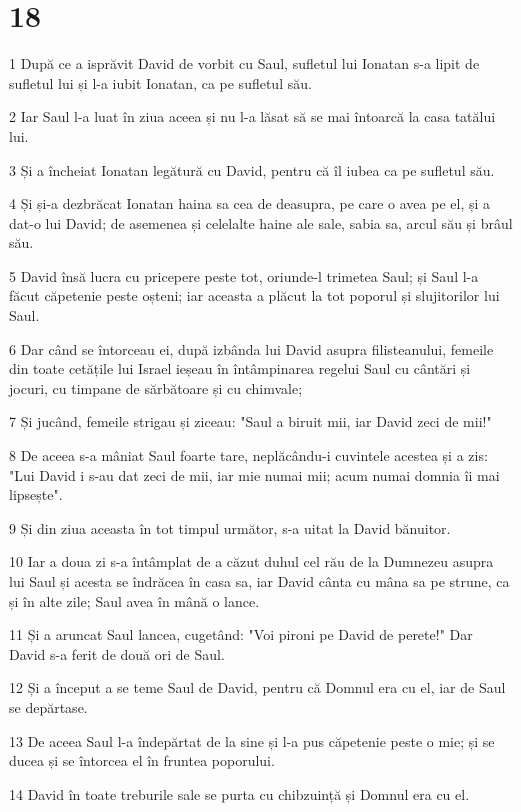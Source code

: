 \chapter{18}

\par 1 După ce a isprăvit David de vorbit cu Saul, sufletul lui Ionatan s-a lipit de sufletul lui și l-a iubit Ionatan, ca pe sufletul său.
\par 2 Iar Saul l-a luat în ziua aceea și nu l-a lăsat să se mai întoarcă la casa tatălui lui.
\par 3 Și a încheiat Ionatan legătură cu David, pentru că îl iubea ca pe sufletul său.
\par 4 Și și-a dezbrăcat Ionatan haina sa cea de deasupra, pe care o avea pe el, și a dat-o lui David; de asemenea și celelalte haine ale sale, sabia sa, arcul său și brâul său.
\par 5 David însă lucra cu pricepere peste tot, oriunde-l trimetea Saul; și Saul l-a făcut căpetenie peste oșteni; iar aceasta a plăcut la tot poporul și slujitorilor lui Saul.
\par 6 Dar când se întorceau ei, după izbânda lui David asupra filisteanului, femeile din toate cetățile lui Israel ieșeau în întâmpinarea regelui Saul cu cântări și jocuri, cu timpane de sărbătoare și cu chimvale;
\par 7 Și jucând, femeile strigau și ziceau: "Saul a biruit mii, iar David zeci de mii!"
\par 8 De aceea s-a mâniat Saul foarte tare, neplăcându-i cuvintele acestea și a zis: "Lui David i s-au dat zeci de mii, iar mie numai mii; acum numai domnia îi mai lipsește".
\par 9 Și din ziua aceasta în tot timpul următor, s-a uitat la David bănuitor.
\par 10 Iar a doua zi s-a întâmplat de a căzut duhul cel rău de la Dumnezeu asupra lui Saul și acesta se îndrăcea în casa sa, iar David cânta cu mâna sa pe strune, ca și în alte zile; Saul avea în mână o lance.
\par 11 Și a aruncat Saul lancea, cugetând: "Voi pironi pe David de perete!" Dar David s-a ferit de două ori de Saul.
\par 12 Și a început a se teme Saul de David, pentru că Domnul era cu el, iar de Saul se depărtase.
\par 13 De aceea Saul l-a îndepărtat de la sine și l-a pus căpetenie peste o mie; și se ducea și se întorcea el în fruntea poporului.
\par 14 David în toate treburile sale se purta cu chibzuință și Domnul era cu el.
